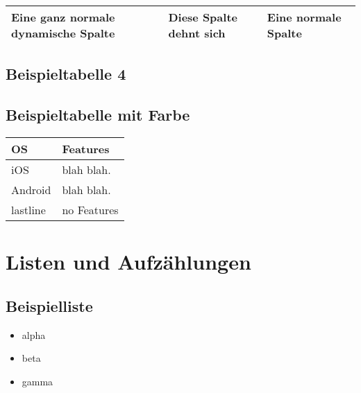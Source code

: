\begin{tabularx}{\textwidth}{|l|X|l|}
\hline Eine ganz normale dynamische Spalte & Diese Spalte dehnt sich& Eine normale Spalte\\ \hline
\end{tabularx}

\subsection{Beispieltabelle 4}


\subsection{Beispieltabelle mit Farbe}

\begin{tabularx}{\textwidth}{|X|l|} \hline
\rowcolor{yellow}  OS      & Features \\ \hline  \hline
iOS     & blah blah. \\  \hline
Android & blah blah. \\   \hline \hline
\rowcolor{green}  lastline      & no Features \\ \hline
\end{tabularx}



\section{Listen und Aufzählungen}
\subsection{Beispielliste}
\begin{itemize}
    \item alpha
    \item beta
    \item gamma
\end{itemize}


